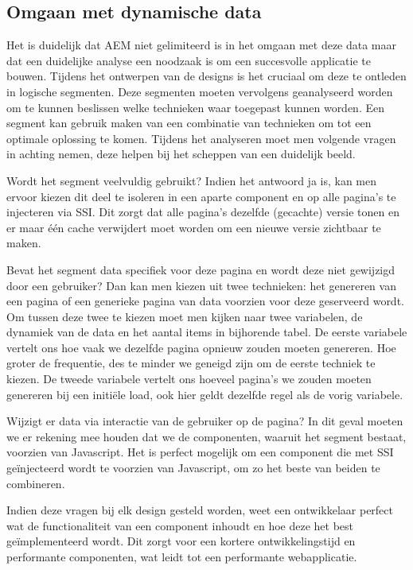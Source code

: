    \subsection{Omgaan met dynamische data}
    Het is duidelijk dat AEM niet gelimiteerd is in het omgaan met deze data maar dat een duidelijke analyse een noodzaak is om een succesvolle applicatie te bouwen. Tijdens het ontwerpen van de designs is het cruciaal om deze te ontleden in logische segmenten. Deze segmenten moeten vervolgens geanalyseerd worden om te kunnen beslissen welke technieken waar toegepast kunnen worden. Een segment kan gebruik maken van een combinatie van technieken om tot een optimale oplossing te komen. Tijdens het analyseren moet men volgende vragen in achting nemen, deze helpen bij het scheppen van een duidelijk beeld.
    \par
    Wordt het segment veelvuldig gebruikt? Indien het antwoord ja is, kan men ervoor kiezen dit deel te isoleren in een aparte component en op alle pagina's te injecteren via SSI. Dit zorgt dat alle pagina's dezelfde (gecachte) versie tonen en er maar één cache verwijdert moet worden om een nieuwe versie zichtbaar te maken.
    \par
    Bevat het segment data specifiek voor deze pagina en wordt deze niet gewijzigd door een gebruiker? Dan kan men kiezen uit twee technieken: het genereren van een pagina of een generieke pagina van data voorzien voor deze geserveerd wordt. Om tussen deze twee te kiezen moet men kijken naar twee variabelen, de dynamiek van de data en het aantal items in bijhorende tabel. De eerste variabele vertelt ons hoe vaak we dezelfde pagina opnieuw zouden moeten genereren. Hoe groter de frequentie, des te minder we geneigd zijn om de eerste techniek te kiezen. De tweede variabele vertelt ons hoeveel pagina's we zouden moeten genereren bij een initiële load, ook hier geldt dezelfde regel als de vorig variabele.
    \par
	Wijzigt er data via interactie van de gebruiker op de pagina? In dit geval moeten we er rekening mee houden dat we de componenten, waaruit het segment bestaat, voorzien van Javascript. Het is perfect mogelijk om een component die met SSI geïnjecteerd wordt te voorzien van Javascript, om zo het beste van beiden te combineren.
	\par
	Indien deze vragen bij elk design gesteld worden, weet een ontwikkelaar perfect wat de functionaliteit van een component inhoudt en hoe deze het best geïmplementeerd wordt. Dit zorgt voor een kortere ontwikkelingstijd en performante componenten, wat leidt tot een performante webapplicatie.      
